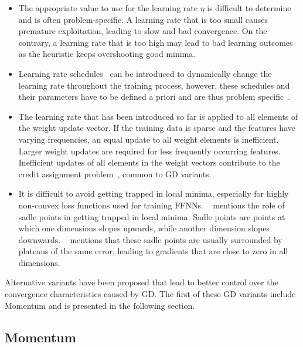 \begin{itemize}
      \item The appropriate value to use for the learning rate $\eta$ is difficult to determine and is often problem-specific. A learning rate that is too small causes premature exploitation, leading to slow and bad convergence. On the contrary, a learning rate that is too high may lead to bad learning outcomes as the heuristic keeps overshooting good minima.

      \item Learning rate schedules~\cite{ref:robbins:1951} can be introduced to dynamically change the learning rate throughout the training process, however, these schedules and their parameters have to be defined a priori and are thus problem specific~\cite{ref:darken:1992}.

      \item The learning rate that has been introduced so far is applied to all elements of the weight update vector. If the training data is sparse and the features have varying frequencies, an equal update to all weight elements is inefficient. Larger weight updates are required for less frequently occurring features. Inefficient updates of all elements in the weight vectors contribute to the credit assignment problem~\cite{ref:rumelhart:1986}, common to \acs{GD} variants.

      \item It is difficult to avoid getting trapped in local minima, especially for highly non-convex loss functions used for training \acp{FFNN}. \citeauthor{ref:dauphin:2014}~\cite{ref:dauphin:2014} mentions the role of sadle points in getting trapped in local minima. Sadle points are points at which one dimensions slopes upwards, while another dimension slopes downwards. \citeauthor{ref:ruder:2016}~\cite{ref:ruder:2016} mentions that these sadle points are usually surrounded by plateaus of the same error, leading to gradients that are close to zero in all dimensions.
\end{itemize}

\noindent
Alternative variants have been proposed that lead to better control over the convergence characteristics caused by \acs{GD}. The first of these \acs{GD} variants include \acs{Momentum} and is presented in the following section.


\subsection{Momentum}\label{sec:heuristics:gd:momentum}

